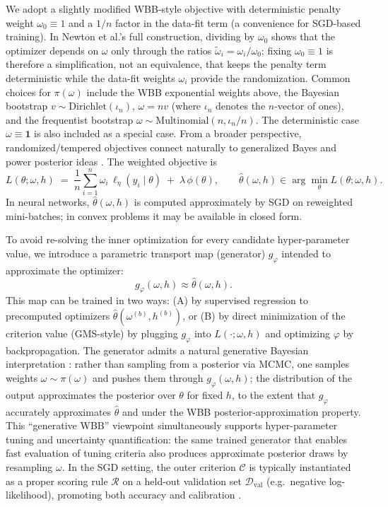 \documentclass[12pt]{article}
\begin{document}
We adopt a slightly modified WBB-style objective with deterministic penalty weight $\omega_0\equiv 1$ and a $1/n$ factor in the data-fit term (a convenience for SGD-based training). In Newton et al.'s full construction, dividing by $\omega_0$ shows that the optimizer depends on $\omega$ only through the ratios $\tilde{\omega}_i=\omega_i/\omega_0$; fixing $\omega_0\equiv 1$ is therefore a simplification, not an equivalence, that keeps the penalty term deterministic while the data-fit weights $\omega_i$ provide the randomization. Common choices for $\pi(\omega)$ include the WBB exponential weights above, the Bayesian bootstrap $v \sim \mathrm{Dirichlet}(\iota_n)$, $\omega = nv$ \citep{rubin1981bayesian} (where $\iota_n$ denotes the $n$-vector of ones), and the frequentist bootstrap $\omega \sim \mathrm{Multinomial}(n, \iota_n/n)$. The deterministic case $\omega\equiv \mathbf{1}$ is also included as a special case. From a broader perspective, randomized/tempered objectives connect naturally to generalized Bayes and power posterior ideas \citep{bissiri2016general,friel2008power}. The weighted objective is
\begin{equation}
\label{eq:inner}
L(\theta;\omega,h)
\;=\;
\frac{1}{n}\sum_{i=1}^n \omega_i\,\ell_{\eta}(y_i\mid \theta)
\;+\;
\lambda\,\phi(\theta),
\qquad
\hat{\theta}(\omega,h)\in \arg\min_{\theta} L(\theta;\omega,h).
\end{equation}
In neural networks, $\hat{\theta}(\omega,h)$ is computed approximately by SGD on reweighted mini-batches; in convex problems it may be available in closed form.

To avoid re-solving the inner optimization for every candidate hyper-parameter value, we introduce a parametric transport map (generator) $g_{\varphi}$ intended to approximate the optimizer:
\[
g_{\varphi}(\omega,h)\approx \hat{\theta}(\omega,h).
\]
This map can be trained in two ways: (A) by supervised regression to precomputed optimizers $\hat{\theta}(\omega^{(b)},h^{(b)})$, or (B) by direct minimization of the criterion value (GMS-style) by plugging $g_{\varphi}$ into $L(\cdot;\omega,h)$ and optimizing $\varphi$ by backpropagation. The generator admits a natural generative Bayesian interpretation \citep{polson2025generative,nareklishvili2023deep}: rather than sampling from a posterior via MCMC, one samples weights $\omega\sim\pi(\omega)$ and pushes them through $g_\varphi(\omega,h)$; the distribution of the output approximates the posterior over $\theta$ for fixed $h$, to the extent that $g_\varphi$ accurately approximates $\hat{\theta}$ and under the WBB posterior-approximation property. This ``generative WBB'' viewpoint simultaneously supports hyper-parameter tuning and uncertainty quantification: the same trained generator that enables fast evaluation of tuning criteria also produces approximate posterior draws by resampling $\omega$. In the SGD setting, the outer criterion $\mathcal{C}$ is typically instantiated as a proper scoring rule $\mathcal{R}$ on a held-out validation set $\mathcal{D}_{\mathrm{val}}$ (e.g.\ negative log-likelihood), promoting both accuracy and calibration \citep{polson2024generative}.
\end{document}
